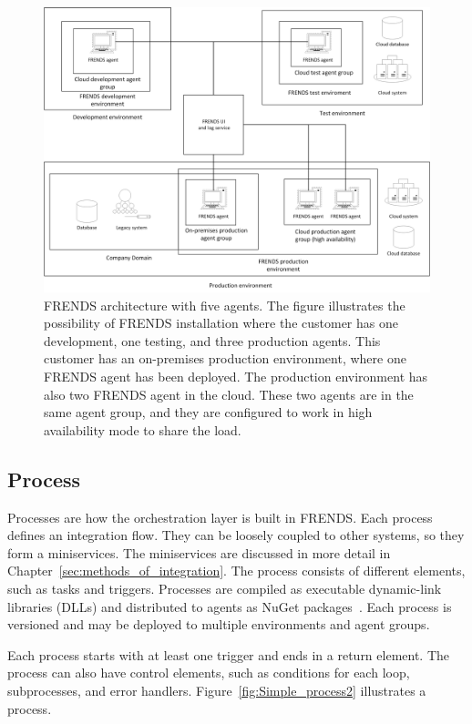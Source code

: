 \documentclass[english, 12pt, a4paper, sci, utf8, a-2b, online, obeyspaces]{aaltothesis}
\begin{document}
\begin{figure}[htb]
  \centering
      \includegraphics[width=\textwidth]{pictures/frends/FRENDS_Architecture.png}
  \caption{FRENDS architecture with five agents. The figure illustrates the possibility of FRENDS installation where the customer has one development, one testing, and three production agents. This customer has an on-premises production environment, where one FRENDS agent has been deployed. The production environment has also two FRENDS agent in the cloud. These two agents are in the same agent group, and they are configured to work in high availability mode to share the load.}
  \label{fig:Frends_architechture}
\end{figure}

\subsection{Process}
\label{sec:process}
Processes are how the orchestration layer is built in FRENDS. Each process defines an integration flow. They can be loosely coupled to other systems, so they form a miniservices. The miniservices are discussed in more detail in Chapter~\ref{sec:methods_of_integration}. The process consists of different elements, such as tasks and triggers. Processes are compiled as executable dynamic-link libraries (DLLs) and distributed to agents as NuGet packages~\cite{microsoft2018nuget}. Each process is versioned and may be deployed to multiple environments and agent groups.

Each process starts with at least one trigger and ends in a return element. The process can also have control elements, such as conditions for each loop, subprocesses, and error handlers. Figure~\ref{fig:Simple_process2} illustrates a process. 
\end{document}
